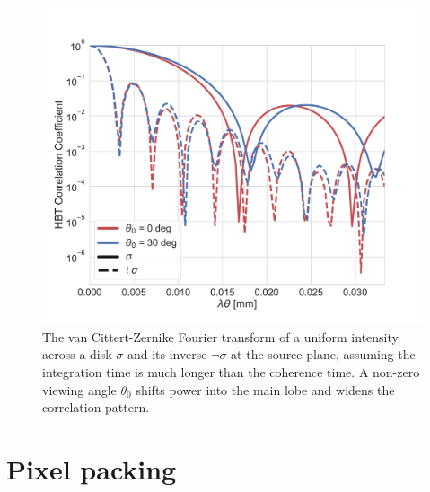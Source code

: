 \begin{figure}[!ht]
    \includegraphics[width=\linewidth, trim=10mm 12mm 16mm 16mm, clip=true]{WhiteNoiseCorrelations/Figures/HBT_coeff.pdf}
    \caption[Hanbury Brown-Twiss correlation pattern on the focal plane]{The van Cittert-Zernike Fourier transform of a uniform intensity across a disk $\sigma$ and its inverse $\neg \sigma$ at the source plane, assuming the integration time is much longer than the coherence time. A non-zero viewing angle $\theta_{0}$ shifts power into the main lobe and widens the correlation pattern.}
    \label{fig:corr_geometry}
\end{figure}

\section{Pixel packing}

